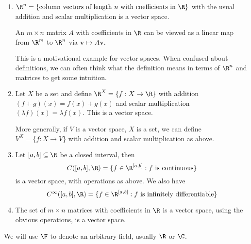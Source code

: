 \documentclass[a4paper]{article}
\begin{document}
\begin{eg}\leavevmode
  \begin{enumerate}
    \item $\R^n = \{\text{column vectors of length }n\text{ with coefficients in }\R\}$ with the usual addition and scalar multiplication is a vector space.

      An $m\times n$ matrix $A$ with coefficients in $\R$ can be viewed as a linear map from $\R^m$ to $\R^n$ via $\mathbf{v} \mapsto A\mathbf{v}$.

      This is a motivational example for vector spaces. When confused about definitions, we can often think what the definition means in terms of $\R^n$ and matrices to get some intuition.

    \item Let $X$ be a set and define $\R^X = \{f: X\to \R\}$ with addition $(f + g)(x) = f(x) + g(x)$ and scalar multiplication $(\lambda f)(x) = \lambda f(x)$. This is a vector space.

      More generally, if $V$ is a vector space, $X$ is a set, we can define $V^X = \{f: X \to V\}$ with addition and scalar multiplication as above.
    \item Let $[a, b]\subseteq \R$ be a closed interval, then
      \[
        C([a, b], \R) = \{f\in \R^{[a,b]}: f\text{ is continuous}\}
      \]
      is a vector space, with operations as above. We also have
      \[
        C^{\infty}([a, b], \R) = \{f\in \R^{[a,b]}: f\text{ is infinitely differentiable}\}
      \]
    \item The set of $m\times n$ matrices with coefficients in $\R$ is a vector space, using the obvious operations, is a vector space.
  \end{enumerate}
\end{eg}

\begin{notation}
  We will use $\F$ to denote an arbitrary field, usually $\R$ or $\C$.
\end{notation}
\end{document}

